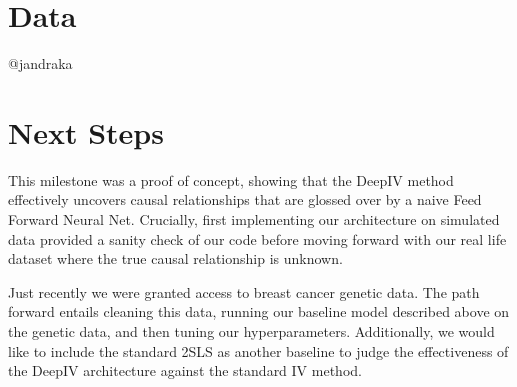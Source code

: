 \documentclass[11pt, oneside, twocolumn]{article}   	%
\begin{document}
\section{Data}
@jandraka

\section{Next Steps}
This milestone was a proof of concept, showing that the DeepIV method effectively uncovers causal relationships that are glossed over by a naive Feed Forward Neural Net. Crucially, first implementing our architecture on simulated data provided a sanity check of our code before moving forward with our real life dataset where the true causal relationship is unknown.

Just recently we were granted access to breast cancer genetic data. The path forward entails cleaning this data, running our baseline model described above on the genetic data, and then tuning our hyperparameters. Additionally, we would like to include the standard 2SLS as another baseline to judge the effectiveness of the DeepIV architecture against the standard IV method. 
\end{document}

